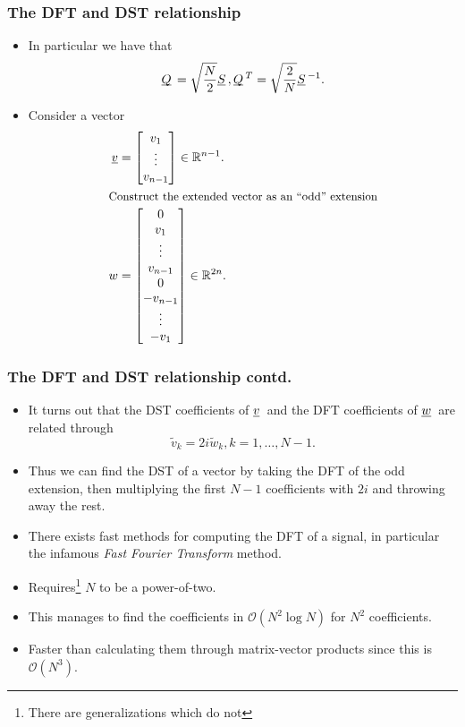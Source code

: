 \documentclass{beamer}
\newcommand{\ub}[1]{\underbar{$#1$}\,}
\begin{document}
\begin{frame}\frametitle{The DFT and DST relationship}
  \begin{itemize}
    \item In particular we have that
      \[
        \ub{Q} = \sqrt{\frac{N}{2}}\ub{S}, \ub{Q}^T = \sqrt{\frac{2}{N}}\ub{S}^{-1}.
      \]
    \item Consider a vector
      \begin{align*}
        \underline{v} &= 
        \begin{bmatrix}
          v_1 \\
          \vdots \\
          v_{n-1}
        \end{bmatrix}
        \in \mathbb{R}^{n-1}. \\
        \intertext{\small Construct the extended vector as an ``odd'' extension}
        w &=
        \begin{bmatrix}
          0 \\ 
          v_1 \\
          \vdots \\
          v_{n-1} \\
          0 \\
          -v_{n-1} \\
          \vdots \\
          -v_1
        \end{bmatrix}
        \in \mathbb{R}^{2n}.
      \end{align*}
      \normalsize
  \end{itemize}
\end{frame}
\begin{frame}\frametitle{The DFT and DST relationship contd.}
  \begin{itemize}
    \item It turns out that the DST coefficients of $\ub{v}$ and the DFT coefficients
      of $\ub{w}$ are related through
      \[
        \tilde{v}_k = 2i\tilde{w}_k, k = 1,\ldots,N-1.
      \]
    \item Thus we can find the DST of a vector by taking the DFT of the odd extension,
      then multiplying the first $N-1$ coefficients with $2i$ and throwing away the rest.
    \item There exists fast methods for computing the DFT of a signal, in particular the
      infamous \emph{Fast Fourier Transform} method.
    \item Requires\footnote{There are generalizations which do not} $N$ to be a power-of-two.
    \item This manages to find the coefficients in $\mathcal{O}\left(N^2\log N\right)$ for $N^2$ coefficients.
    \item Faster than calculating them through matrix-vector products since this is $\mathcal{O}\left(N^3\right)$.
  \end{itemize}
\end{frame}
\end{document}
